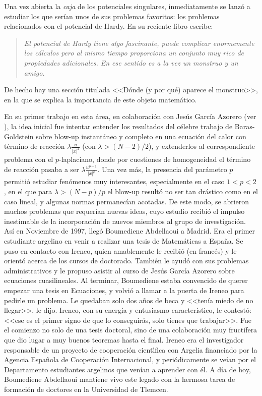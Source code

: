 Una vez abierta la {\it caja} de los potenciales singulares, inmediatamente se lanz\'o a estudiar los que ser\'ian unos de sus problemas favoritos: los problemas relacionados con el potencial de Hardy. En su reciente libro \cite{PSbook} escribe:
\begin{quote}
\textit{El potencial de Hardy tiene algo fascinante, puede complicar enormemente los c\'alculos pero al mismo tiempo proporciona un conjunto muy rico de propiedades adicionales. En ese sentido es a la vez un monstruo y un amigo.}
\end{quote}
De hecho hay una secci\'on titulada <<D\'onde (y por qu\'e) aparece el monstruo>>,  en la que se explica la importancia de este objeto matem\'atico.

En su primer trabajo en esta \'area, en colaboraci\'on con Jes\'us Garc\'ia Azorero (ver \cite{Azorero-Peral_5}), la idea inicial  fue intentar entender los resultados del c\'elebre trabajo de Baras-Goldstein sobre blow-up instant\'aneo y completo en una ecuaci\'on del calor con t\'ermino de reacci\'on $\lambda \frac u{|x|^2} $ (con $ \lambda>(N-2)/2$), y extenderlos al correspondiente problema con el $p$-laplaciano, donde por cuestiones de homogeneidad el t\'ermino de reacci\'on pasaba a ser $\lambda \frac {u^{p-1}}{|x|^p} $. Una vez m\'as, la presencia del par\'ametro $p$ permiti\'o estudiar fen\'omenos muy interesantes, especialmente en el caso $1<p<2$, en el que para $ \lambda >(N-p)/p$ el blow-up result\'o no ser tan dr\'astico como en el caso lineal, y algunas normas permanec\'ian acotadas. De este modo, se abrieron muchos problemas que requer\'ian nuevas ideas, cuyo estudio recibi\'o el impulso inestimable de la incorporaci\'on de nuevos miembros al grupo de investigaci\'on. As\'i en Noviembre de 1997, lleg\'o Boumediene Abdellaoui a Madrid. Era el  primer estudiante argelino en venir a realizar una tesis de Matem\'aticas a Espa\~{n}a. Se puso en contacto con Ireneo, quien amablemente le recibi\'o (en franc\'es) y le orient\'o acerca de los cursos de doctorado. Tambi\'en le ayud\'o con sus problemas administrativos y le propuso asistir al curso de Jes\'us Garc\'ia Azorero sobre ecuaciones cuasilineales. Al terminar, Boumediene estaba convencido de querer empezar una tesis en Ecuaciones, y volvi\'o a llamar a la puerta de Ireneo para pedirle un problema. Le quedaban solo dos a\~{n}os de beca y <<ten\'ia miedo de no llegar>>, le dijo. Ireneo, con su energ\'ia y entusiasmo caracter\'istico, le contest\'o:  <<ese es el primer signo de que lo conseguir\'as, solo tienes que trabajar>>. Fue el comienzo no solo de una tesis doctoral, sino de una colaboraci\'on muy fruct\'ifera que dio lugar a muy buenos teoremas hasta el final.  Ireneo era el investigador responsable de un proyecto de cooperaci\'on cient\'{\i}fica con Argelia financiado por la Agencia Espa\~nola de Cooperaci\'on Internacional,  y peri\'odicamente se ve\'ian por el Departamento estudiantes argelinos que ven\'ian a aprender con \'el. A d\'ia de hoy, Boumediene Abdellaoui mantiene vivo este legado con la hermosa tarea de formaci\'on de doctores en la Universidad de Tlemcen.

